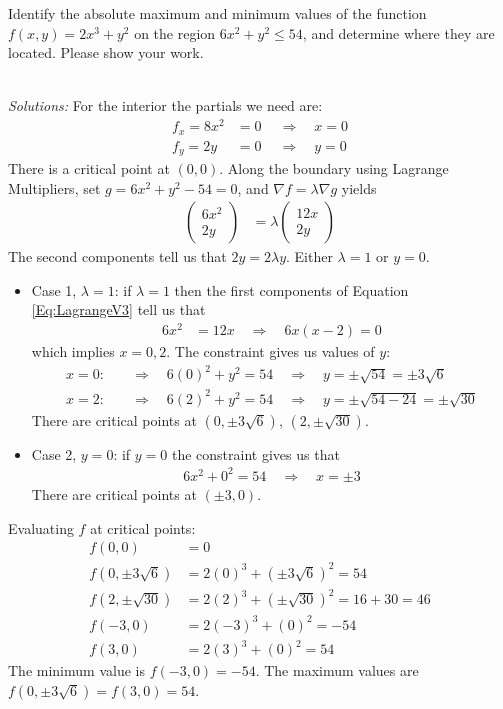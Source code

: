 \ifnum {}
\question[6] Identify the absolute maximum and minimum values of the function $f(x,y) = 2x^3 + y^2$ on the region $6x^2+y^2 \le 54$, and determine where they are located. Please show your work. 
\ifnum {} {\color{DarkBlue} \\ \textit{Solutions:} For the interior the partials we need are: 
\begin{align*}
    f_x = 8x^2 &=0 \ \quad \Rightarrow \quad x= 0 \\
    f_y = 2y &=0 \ \quad \Rightarrow \quad y= 0 
\end{align*}
There is a critical point at $(0,0)$. Along the boundary using Lagrange Multipliers, set $g = 6x^2 + y^2 - 54 = 0$, and $\nabla f = \lambda \nabla g$ yields
\begin{align}\label{Eq:LagrangeV3}
        \begin{pmatrix} 6x^2 \\ 2y \end{pmatrix} 
        &= \lambda \begin{pmatrix} 12x\\2y \end{pmatrix} 
    \end{align}
    The second components tell us that $2y = 2\lambda y$. Either $\lambda =1$ or $y=0$. 
    \begin{itemize}
        \item Case 1, $\lambda =1$: if $\lambda =1$ then the first components of Equation \ref{Eq:LagrangeV3} tell us that \begin{align}
            6x^2 &= 12x \quad \Rightarrow \quad 6x(x-2) =0  
        \end{align} which implies $x = 0,2$. The constraint gives us values of $y$: 
        \begin{align}
            x = 0: & \quad \Rightarrow \quad 6(0)^2 + y^2 = 54 \quad \Rightarrow \quad y= \pm \sqrt{54} = \pm 3\sqrt{6} \\
            x = 2: & \quad \Rightarrow \quad 6(2)^2 + y^2 = 54 \quad \Rightarrow \quad y= \pm \sqrt{54 - 24} = \pm \sqrt{30}
        \end{align}
        There are critical points at $(0,\pm3\sqrt{6})$, $(2,\pm\sqrt{30})$.
        \item Case 2, $y=0$: if $y=0$ the constraint gives us that 
        \begin{align}
            6x^2 + 0^2 = 54 \quad \Rightarrow \quad x = \pm 3
        \end{align}
        There are critical points at $(\pm3,0)$. 
    \end{itemize}
    Evaluating $f$ at critical points: 
    \begin{align}
        f(0,0) &= 0 \\
        f(0,\pm3\sqrt6) &= 2(0)^3 + (\pm3\sqrt6)^2 = 54 \\
        f(2,\pm\sqrt{30}) &= 2(2)^3 + (\pm\sqrt{30})^2 = 16+30 = 46 \\
        f(-3,0) &= 2(-3)^3 + (0)^2 = -54 \\
        f(3,0) &= 2(3)^3 + (0)^2 = 54 
    \end{align}
    The minimum value is $f(-3,0)=-54$. The maximum values are $f(0,\pm3\sqrt6) = f(3,0) = 54$. 
    } 
   \else
      
